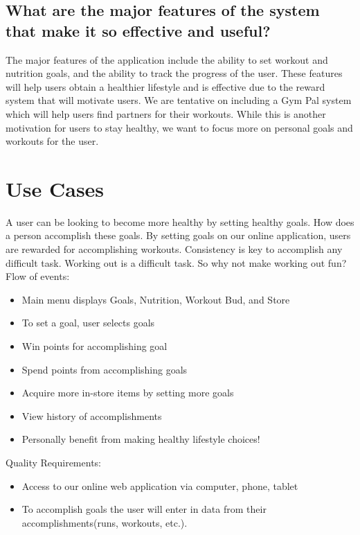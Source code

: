 \documentclass[a4paper]{article}
\begin{document}
\subsection{What are the major features of the system that make it so effective and useful?}
The major features of the application include the ability to set workout and nutrition goals, and the ability to track the progress of the user.  These features will help users obtain a healthier lifestyle and is effective due to the reward system that will motivate users.  We are tentative on including a Gym Pal system which will help users find partners for their workouts.  While this is another motivation for users to stay healthy, we want to focus more on personal goals and workouts for the user. 

\section{Use Cases}
A user can be looking to become more healthy by setting healthy goals. How does a person accomplish these goals. By setting goals on our online application, users are rewarded for accomplishing workouts. Consistency is key to accomplish any difficult task. Working out is a difficult task. So why not make working out fun? 
\newline
\newline
Flow of events:
\begin{itemize}
\item Main menu displays Goals, Nutrition, Workout Bud, and Store
\item To set a goal, user selects goals
\item Win points for accomplishing goal
\item Spend points from accomplishing goals
\item Acquire more in-store items by setting more goals 
\item View history of accomplishments 
\item Personally benefit from making healthy lifestyle choices!
\end{itemize}
Quality Requirements:
\newline

\begin{itemize}
\item Access to our online web application via computer, phone, tablet
\item To accomplish goals the user will enter in data from their accomplishments(runs, workouts, etc.). 
\end{itemize}
\end{document}
